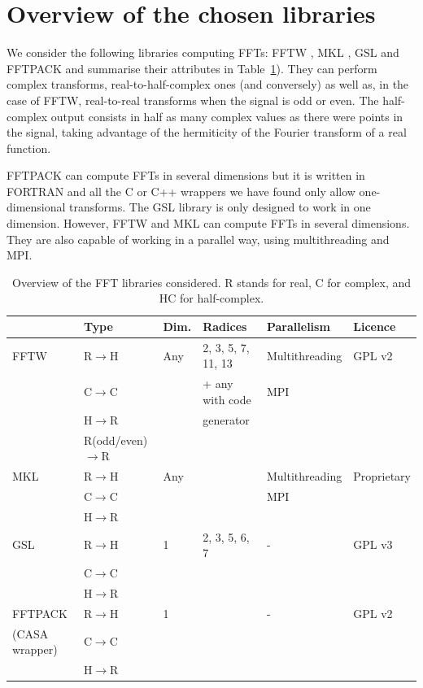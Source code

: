 \documentclass[12pt, a4paper]{article}
\begin{document}
\section{Overview of the chosen libraries}
We consider the following libraries computing FFTs: FFTW \cite{fftw}, MKL \cite{mkl}, GSL \cite{gsl} 
and FFTPACK \cite{fftpack} and summarise their attributes in Table~\ref{ffttable}). They can 
perform complex transforms, 
real-to-half-complex ones (and conversely) as well as, in the case of FFTW, real-to-real transforms 
when the signal is odd or even. The half-complex output consists in half as many complex values as 
there were points in the signal, taking advantage of the hermiticity of the Fourier transform of a 
real function.

FFTPACK can compute FFTs in several dimensions but it is written in FORTRAN and all the C or C++ 
wrappers we have found only allow one-dimensional transforms. The GSL library is only designed to 
work in one dimension. However, FFTW and MKL can compute FFTs in several dimensions. They are also 
capable of working in a parallel way, using multithreading and MPI.  
\begin{table}[H]  
\captionsetup{width=1\textwidth}
\begin{tabular}{|l||l|l|l|l|l|}
\hline
& Type & Dim. & Radices & Parallelism & Licence \\
\hline
\hline
FFTW & R$\to$H & Any & 2, 3, 5, 7, 11, 13  & Multithreading  & GPL v2\\
& C$\to$C & & + any with code & MPI &  \\
&  H$\to$R & &  generator & &  \\
& R{\scriptsize (odd/even)}$\to$R & & & &  \\
\hline
MKL  &  R$\to$H & Any & & Multithreading & Proprietary\\
& C$\to$C & & & MPI &  \\
&  H$\to$R & & & &  \\
\hline
GSL  &  R$\to$H & 1 & 2, 3, 5, 6, 7 & - & GPL v3\\
& C$\to$C & & & &  \\
&  H$\to$R & & & &  \\
\hline
FFTPACK  &  R$\to$H  & 1 & & - & GPL v2\\
{\scriptsize (CASA wrapper)} & C$\to$C & & & &  \\
&  H$\to$R & & & &  \\
\hline
\end{tabular}
\caption{Overview of the FFT libraries considered. R stands for real, C for complex, and HC for half-complex.}
\label{ffttable}
\end{table}
\end{document}
